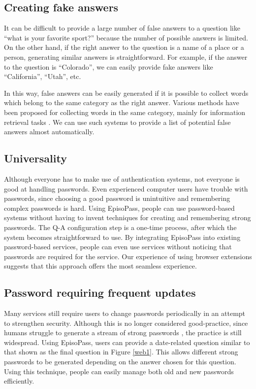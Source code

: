 \documentclass[runningheads,a4paper]{llncs}
\begin{document}
\subsection{Creating fake answers}

It can be difficult to provide a large number of false answers to a question like
``what is your favorite sport?''
because the number of possible answers is limited.
%
On the other hand, if the right answer to the question is a name of a place or a person,
generating similar answers is straightforward.
For example, if the answer to the question is ``Colorado'',
we can easily provide fake answers like ``California'', ``Utah'', etc.

In this way, false answers can be easily generated
if it is possible to collect words which belong to the same
category as the right answer.
%
Various methods have been proposed for collecting words in the
same category, mainly for information retrieval tasks%
\cite{Huang:2012:LFC:2426725.2426728,BooWa,Wang:2007:LSE:1441428.1442086}. %
We can use such systems to provide a list of potential false answers almost automatically.

\subsection{Universality}

Although everyone has to make use of authentication systems, not everyone
is good at handling passwords.
Even experienced computer users have trouble with passwords,
since choosing a good password is unintuitive and remembering complex
passwords is hard.
%
Using EpisoPass, people can use password-based systems without having to invent
techniques for creating and remembering strong passwords. The Q-A configuration step
is a one-time process, after which the system becomes straightforward to use.
%
By integrating EpisoPass into existing password-based services,
people can even use services without noticing that passwords are
required for the service.
%
Our experience of using browser extensions suggests that
this approach offers the most seamless experience.

\subsection{Password requiring frequent updates}

Many services still require users to change passwords periodically in an attempt
to strengthen security.
%
Although this is no longer considered good-practice, since humans struggle to
generate a stream of strong passwords \cite{Schneier:change}, the practice is
still widespread.
%
%
Using EpisoPass, users can provide a date-related question
similar to that shown as the final question in Figure \ref{web1}. This allows
different strong passwords to be generated depending on the answer chosen
for this question. Using this technique, people can easily manage both old and new 
passwords efficiently.
\end{document}
